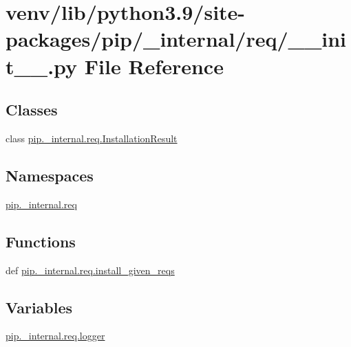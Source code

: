 \hypertarget{venv_2lib_2python3_89_2site-packages_2pip_2__internal_2req_2____init_____8py}{}\section{venv/lib/python3.9/site-\/packages/pip/\+\_\+internal/req/\+\_\+\+\_\+init\+\_\+\+\_\+.py File Reference}
\label{venv_2lib_2python3_89_2site-packages_2pip_2__internal_2req_2____init_____8py}
\subsection*{Classes}
\begin{DoxyCompactItemize}
\item 
class \hyperlink{classpip_1_1__internal_1_1req_1_1InstallationResult}{pip.\+\_\+internal.\+req.\+Installation\+Result}
\end{DoxyCompactItemize}
\subsection*{Namespaces}
\begin{DoxyCompactItemize}
\item 
 \hyperlink{namespacepip_1_1__internal_1_1req}{pip.\+\_\+internal.\+req}
\end{DoxyCompactItemize}
\subsection*{Functions}
\begin{DoxyCompactItemize}
\item 
def \hyperlink{namespacepip_1_1__internal_1_1req_abd43b436256d26dd6f73b989a785bcf3}{pip.\+\_\+internal.\+req.\+install\+\_\+given\+\_\+reqs}
\end{DoxyCompactItemize}
\subsection*{Variables}
\begin{DoxyCompactItemize}
\item 
\hyperlink{namespacepip_1_1__internal_1_1req_ac8b651e06f7e4ca3a12dbc99244c77cf}{pip.\+\_\+internal.\+req.\+logger}
\end{DoxyCompactItemize}
